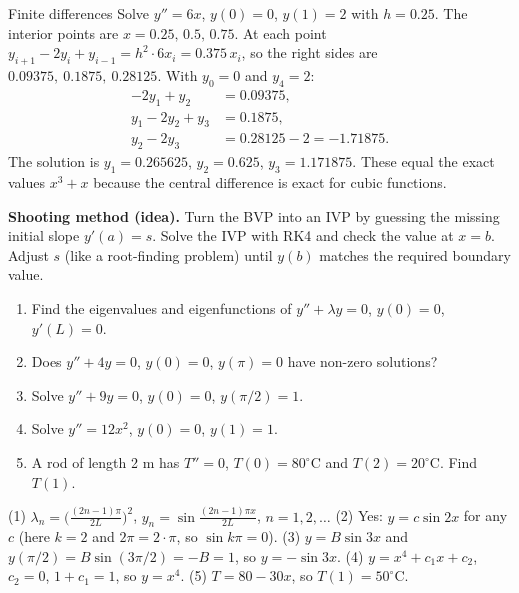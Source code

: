 \begin{examplebox}{Finite differences}
Solve $y''=6x$, $y(0) = 0$, $y(1)=2$ with $h = 0.25$. The interior points are $x = 0.25,\,0.5,\,0.75$. At each point $y_{i+1} - 2y_i + y_{i-1} = h^2\cdot 6x_i = 0.375\,x_i$, so the right sides are $0.09375,\ 0.1875,\ 0.28125$. With $y_0=0$ and $y_4=2$:
\begin{align*}
-2y_1 + y_2 &= 0.09375,\\
y_1 - 2y_2 + y_3 &= 0.1875,\\
y_2 - 2y_3 &= 0.28125 - 2 = -1.71875.
\end{align*}
The solution is $y_1 = 0.265625$, $y_2 = 0.625$, $y_3 = 1.171875$. These equal the exact values $x^3 + x$ because the central difference is exact for cubic functions.
\end{examplebox}

\textbf{Shooting method (idea).} Turn the BVP into an IVP by guessing the missing initial slope $y'(a)=s$. Solve the IVP with RK4 and check the value at $x=b$. Adjust $s$ (like a root-finding problem) until $y(b)$ matches the required boundary value.

\begin{practicebox}
\begin{enumerate}
  \item Find the eigenvalues and eigenfunctions of $y'' + \lambda y = 0$, $y(0)=0$, $y'(L)=0$.
  \item Does $y'' + 4y = 0$, $y(0)=0$, $y(\pi)=0$ have non-zero solutions?
  \item Solve $y'' + 9y = 0$, $y(0)=0$, $y(\pi/2) = 1$.
  \item Solve $y'' = 12x^2$, $y(0)=0$, $y(1)=1$.
  \item A rod of length 2 m has $T''=0$, $T(0)=80^\circ$C and $T(2)=20^\circ$C. Find $T(1)$.
\end{enumerate}
\end{practicebox}

\begin{answerbox}
(1) $\lambda_n = \big(\frac{(2n-1)\pi}{2L}\big)^2$, $y_n = \sin\frac{(2n-1)\pi x}{2L}$, $n=1,2,\dots$ \quad (2) Yes: $y = c\sin 2x$ for any $c$ (here $k=2$ and $2\pi = 2\cdot\pi$, so $\sin k\pi=0$). \quad (3) $y = B\sin 3x$ and $y(\pi/2) = B\sin(3\pi/2) = -B = 1$, so $y = -\sin 3x$. \quad (4) $y = x^4 + c_1x + c_2$, $c_2 = 0$, $1 + c_1 = 1$, so $y = x^4$. \quad (5) $T = 80 - 30x$, so $T(1) = 50^\circ$C.
\end{answerbox}
